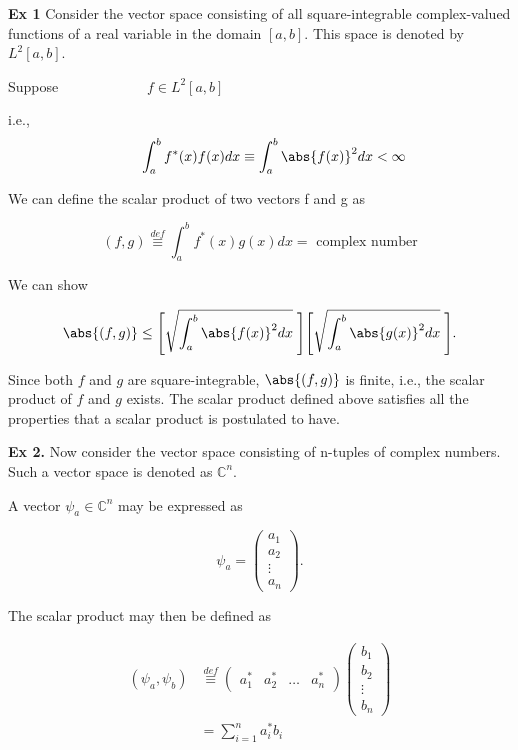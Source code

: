 \begin{description}
\item {\bf Ex 1} Consider the vector space consisting of all square-integrable complex-valued functions of a real variable in the domain $[a,b]$. This space is denoted by $L^2[a,b]$.

Suppose $\quad \quad \quad \quad \quad \quad  f \in L^2[a,b]$

i.e., 
  $$\quad \quad \int_a^bf^\ast(x)f(x)dx \equiv \int_a^b\abs{f(x)}^2dx < \infty$$

We can define the scalar product of two vectors f and g as

$$(f,g) \stackrel{def}{\equiv} \int_a^bf^\ast(x)g(x)dx = \text{ complex number}$$

We can show

$$\abs{(f,g)} \leq \Bigg[\sqrt{\int_{a}^{b} \abs{f(x)}^2 dx}\hspace{1mm}\Bigg]\Bigg[\sqrt{\int_{a}^{b} \abs{g(x)}^2 dx}\hspace{1mm}\Bigg].$$

Since both $f$ and $g$ are square-integrable, $\abs{(f,g)}$ is finite, i.e., the scalar product of $f$ and $g$ exists. The scalar product defined above satisfies all the properties that a scalar product is postulated to have.

\item {\bf Ex 2.} Now consider the vector space consisting of n-tuples of complex numbers. Such a vector space is denoted as $\mathbb{C}^n$.

\hspace{5mm}A vector  $\psi_a \in \mathbb{C}^n$ may be expressed as

$$\psi_a = \begin{pmatrix} a_1 \\ a_2 \\ \vdots \\ a_n \end{pmatrix}.$$

The scalar product may then be defined as

\begin{align*}
(\psi_a,\psi_b) & \stackrel{def}{\equiv}
\begin{pmatrix}
    a_1^\ast & a_2^\ast & \hdots & a_n^\ast
\end{pmatrix}
\begin{pmatrix}
        b_1 \\  b_2 \\ \vdots \\ b_n 
\end{pmatrix}  \\
               & = \sum_{i=1}^{n} a_i^\ast b_i
\end{align*}


\end{description}
